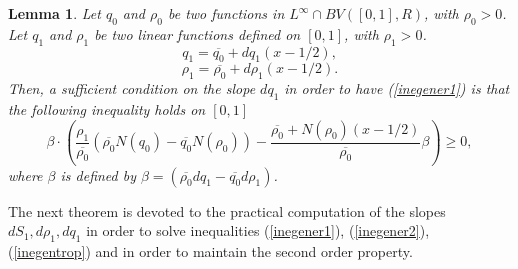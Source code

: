 \documentclass{fldauth}
\theoremstyle{plain}
\theoremstyle{plain}
\newtheorem{lem}{Lemma}
\theoremstyle{plain}
\theoremstyle{plain}
\theoremstyle{plain}
\theoremstyle{plain}
\begin{document}
\begin{lem}
Let \( q_{0} \) and \( \rho _{0} \) be two functions in \( L^{\infty }\cap BV([0,1],R) \),
with \( \rho _{0}>0 \). Let \( q_{1} \) and \( \rho _{1} \) be two linear
functions defined on \( [0,1] \), with \( \rho _{1}>0 \).
\begin{equation}
\label{linear:q}
q_{1}=\overline{q_{0}}+dq_{1}(x-1/2),
\end{equation}
\[
\rho _{1}=\overline{\rho _{0}}+d\rho _{1}(x-1/2).\]
Then, a sufficient condition on the slope \( dq_{1} \) in order to have (\ref{inegener1})
is that the following inequality holds on \( [0,1] \)
\begin{equation}
\label{ineg:q}
\beta \cdot \left( \frac{\rho _{1}}{\overline{\rho _{0}}}(\overline{\rho _{0}}N(q_{0})-\overline{q_{0}}N(\rho _{0}))-\frac{\overline{\rho _{0}}+N(\rho _{0})(x-1/2)}{\overline{\rho _{0}}}\beta \right) \geq 0,
\end{equation}
where \( \beta  \) is defined by \( \beta =(\overline{\rho _{0}}dq_{1}-\overline{q_{0}}d\rho _{1}) \).
\end{lem}
The next theorem is devoted to the practical computation of the slopes \( dS_{1},d\rho _{1},dq_{1} \)
in order to solve inequalities (\ref{inegener1}), (\ref{inegener2}), (\ref{inegentrop})
and in order to maintain the second order property.
\end{document}
